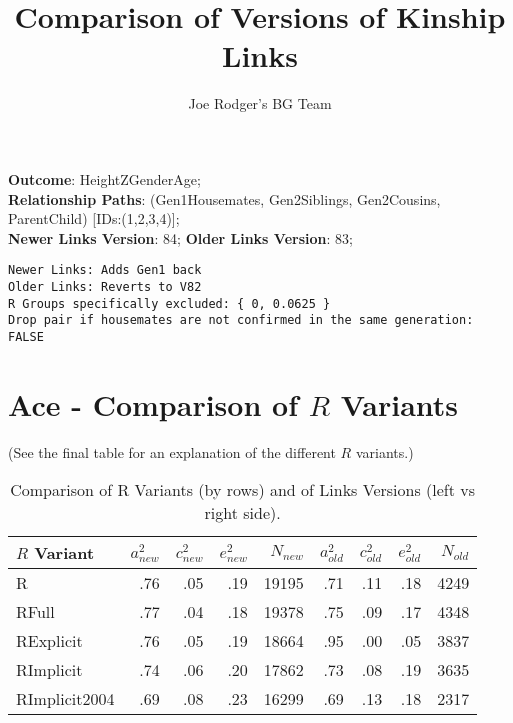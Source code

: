 \documentclass{article}\usepackage[]{graphicx}\usepackage[]{color}
\title{Comparison of Versions of Kinship Links}
\author{Joe Rodger's BG Team}
\makeatletter
\newenvironment{kframe}{%
 \def\at@end@of@kframe{}%
 \ifinner\ifhmode%
  \def\at@end@of@kframe{\end{minipage}}%
  \begin{minipage}{\columnwidth}%
 \fi\fi%
 \def\FrameCommand##1{\hskip\@totalleftmargin \hskip-\fboxsep
 \colorbox{shadecolor}{##1}\hskip-\fboxsep
     \hskip-\linewidth \hskip-\@totalleftmargin \hskip\columnwidth}%
 \MakeFramed {\advance\hsize-\width
   \@totalleftmargin\z@ \linewidth\hsize
   \@setminipage}}%
 {\par\unskip\endMakeFramed%
 \at@end@of@kframe}
\newenvironment{knitrout}{}{} %
\makeatother
\begin{document}
\maketitle
\setcounter{totalnumber}{8} %

\setlength{\parindent}{0pt}%











\textbf{Outcome}: HeightZGenderAge;\\
\textbf{Relationship Paths}: (Gen1Housemates, Gen2Siblings, Gen2Cousins, ParentChild) [IDs:(1,2,3,4)];\\
\textbf{Newer Links Version}: 84;
\textbf{Older Links Version}: 83;

\begin{knitrout}
\color{fgcolor}\begin{kframe}
\begin{verbatim}
Newer Links: Adds Gen1 back
Older Links: Reverts to V82
R Groups specifically excluded: { 0, 0.0625 }
Drop pair if housemates are not confirmed in the same generation: FALSE
\end{verbatim}
\end{kframe}
\end{knitrout}





\section{Ace - Comparison of $R$ Variants} 
(See the final table for an explanation of the different $R$ variants.)
\begin{table}[ht]
\centering
{\large
\begin{tabular}{l|rrrr|rrrr}
  \hline
$R$ Variant & $a_{new}^2$ & $c_{new}^2$ & $e_{new}^2$ & $N_{new}$ & $a_{old}^2$ & $c_{old}^2$ & $e_{old}^2$ & $N_{old}$ \\ 
  \hline
R & .76 & .05 & .19 & 19195 & .71 & .11 & .18 & 4249 \\ 
  RFull & .77 & .04 & .18 & 19378 & .75 & .09 & .17 & 4348 \\ 
  RExplicit & .76 & .05 & .19 & 18664 & .95 & .00 & .05 & 3837 \\ 
  RImplicit & .74 & .06 & .20 & 17862 & .73 & .08 & .19 & 3635 \\ 
  RImplicit2004 & .69 & .08 & .23 & 16299 & .69 & .13 & .18 & 2317 \\ 
   \hline
\end{tabular}
}
\caption{Comparison of R Variants (by rows) and of Links Versions (left vs right side).} 
\end{table}
\end{document}
